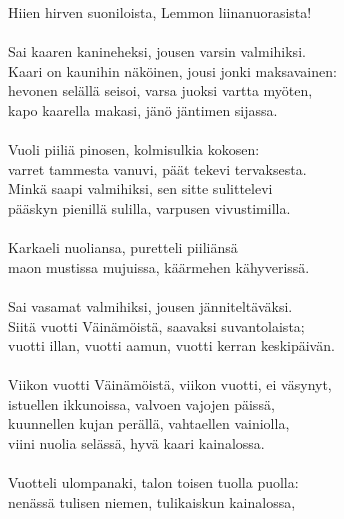 Hiien hirven suoniloista, Lemmon liinanuorasista!           \\
                                                            \\
Sai kaaren kanineheksi, jousen varsin valmihiksi.           \\
Kaari on kaunihin näköinen, jousi jonki maksavainen:        \\
hevonen selällä seisoi, varsa juoksi vartta myöten,         \\
kapo kaarella makasi, jänö jäntimen sijassa.                \\
                                                            \\
Vuoli piiliä pinosen, kolmisulkia kokosen:                  \\
varret tammesta vanuvi, päät tekevi tervaksesta.            \\
Minkä saapi valmihiksi, sen sitte sulittelevi               \\
pääskyn pienillä sulilla, varpusen vivustimilla.            \\
                                                            \\
Karkaeli nuoliansa, puretteli piiliänsä                     \\
maon mustissa mujuissa, käärmehen kähyverissä.              \\
                                                            \\
Sai vasamat valmihiksi, jousen jänniteltäväksi.             \\
Siitä vuotti Väinämöistä, saavaksi suvantolaista;           \\
vuotti illan, vuotti aamun, vuotti kerran keskipäivän.      \\
                                                            \\
Viikon vuotti Väinämöistä, viikon vuotti, ei väsynyt,       \\
istuellen ikkunoissa, valvoen vajojen päissä,               \\
kuunnellen kujan perällä, vahtaellen vainiolla,             \\
viini nuolia selässä, hyvä kaari kainalossa.                \\
                                                            \\
Vuotteli ulompanaki, talon toisen tuolla puolla:            \\
nenässä tulisen niemen, tulikaiskun kainalossa,             \\
